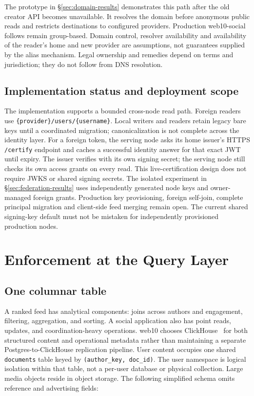 \documentclass[sigconf, nonacm]{acmart}
\begin{document}
The prototype in \S\ref{sec:domain-results} demonstrates this path after the
old creator API becomes unavailable. It resolves the domain before anonymous
public reads and restricts destinations to configured providers. Production
web10-social follows remain group-based. Domain control, resolver availability
and availability of the reader's home and new provider are assumptions, not
guarantees supplied by the alias mechanism. Legal ownership and remedies depend
on terms and jurisdiction; they do not follow from DNS resolution.

\subsection{Implementation status and deployment scope}

The implementation supports a bounded cross-node read path. Foreign
readers use \texttt{\{provider\}/users/\{username\}}. Local writers and readers
retain legacy bare keys until a coordinated migration; canonicalization is
not complete across the identity layer. For a foreign token, the serving node
asks its home issuer's HTTPS \texttt{/certify} endpoint and caches a successful
identity answer for that exact JWT until expiry. The issuer verifies with its
own signing secret; the serving node still checks its own access grants on
every read. This live-certification design does not require JWKS or shared
signing secrets. The isolated experiment in \S\ref{sec:federation-results}
uses independently generated node keys and owner-managed foreign grants.
Production key provisioning, foreign self-join, complete principal migration
and client-side feed merging remain open. The current shared signing-key
default must not be mistaken for independently provisioned production nodes.

\section{Enforcement at the Query Layer}
\label{sec:enforcement}

\subsection{One columnar table}

A ranked feed has analytical components: joins across authors and engagement,
filtering, aggregation, and sorting. A social application also has point reads,
updates, and coordination-heavy operations. web10 chooses
ClickHouse~\cite{clickhouse2024} for
both structured content and operational metadata rather than maintaining a
separate Postgres-to-ClickHouse replication pipeline. User content occupies
one shared \texttt{documents} table keyed by \texttt{(author\_key, doc\_id)}.
The user namespace is logical isolation within that table, not a per-user
database or physical collection. Large media objects reside in object storage.
The following simplified schema omits reference and advertising fields:
\end{document}

